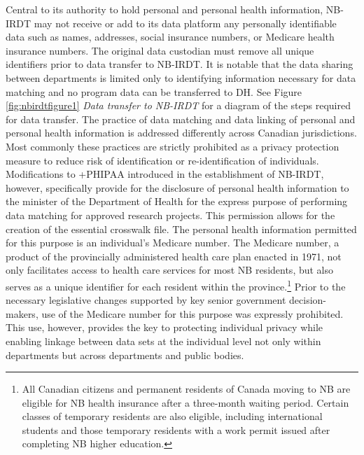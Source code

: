 \documentclass[
]{book}
\begin{document}
Central to its authority to hold personal and personal health information, NB-IRDT may not receive or add to its data platform any personally identifiable data such as names, addresses, social insurance numbers, or Medicare health insurance numbers. The original data custodian must remove all unique identifiers prior to data transfer to NB-IRDT. It is notable that the data sharing between departments is limited only to identifying information necessary for data matching and no program data can be transferred to DH. See Figure \ref{fig:nbirdtfigure1} \emph{Data transfer to NB-IRDT} for a diagram of the steps required for data transfer. The practice of data matching and data linking of personal and personal health information is addressed differently across Canadian jurisdictions. Most commonly these practices are strictly prohibited as a privacy protection measure to reduce risk of identification or re-identification of individuals. Modifications to +PHIPAA\textbar{} introduced in the establishment of NB-IRDT, however, specifically provide for the disclosure of personal health information to the minister of the Department of Health for the express purpose of performing data matching for approved research projects. This permission allows for the creation of the essential crosswalk file. The personal health information permitted for this purpose is an individual's Medicare number. The Medicare number, a product of the provincially administered health care plan enacted in 1971, not only facilitates access to health care services for most NB residents, but also serves as a unique identifier for each resident within the province.\footnote{All Canadian citizens and permanent residents of Canada moving to NB are eligible for NB health insurance after a three-month waiting period. Certain classes of temporary residents are also eligible, including international students and those temporary residents with a work permit issued after completing NB higher education.} Prior to the necessary legislative changes supported by key senior government decision-makers, use of the Medicare number for this purpose was expressly prohibited. This use, however, provides the key to protecting individual privacy while enabling linkage between data sets at the individual level not only within departments but across departments and public bodies.
\end{document}
